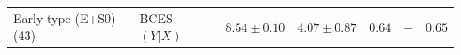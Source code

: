 \documentclass[preprint2]{emulateapj}
\begin{document}
\begin{table}
\begin{tabular}{llccccc}
%
%
 Early-type (E+S0) (43)	& BCES $(Y|X)$  	     & $8.54 \pm 0.10$ & $4.07 \pm 0.87$ & $0.64$ & $-$ & $0.65$ \\

\end{tabular}
\end{table}
\end{document}
